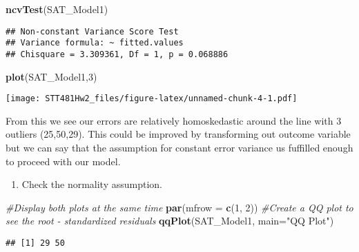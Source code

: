 \documentclass[]{article}
\newenvironment{Shaded}{\begin{snugshade}}{\end{snugshade}}
\newcommand{\KeywordTok}[1]{\textcolor[rgb]{0.13,0.29,0.53}{\textbf{#1}}}
\newcommand{\DataTypeTok}[1]{\textcolor[rgb]{0.13,0.29,0.53}{#1}}
\newcommand{\DecValTok}[1]{\textcolor[rgb]{0.00,0.00,0.81}{#1}}
\newcommand{\StringTok}[1]{\textcolor[rgb]{0.31,0.60,0.02}{#1}}
\newcommand{\CommentTok}[1]{\textcolor[rgb]{0.56,0.35,0.01}{\textit{#1}}}
\newcommand{\NormalTok}[1]{#1}
\providecommand{\tightlist}{%
  \setlength{\itemsep}{0pt}\setlength{\parskip}{0pt}}
\begin{document}
\begin{Shaded}
\begin{Highlighting}[]
\KeywordTok{ncvTest}\NormalTok{(SAT_Model1)}
\end{Highlighting}
\end{Shaded}

\begin{verbatim}
## Non-constant Variance Score Test 
## Variance formula: ~ fitted.values 
## Chisquare = 3.309361, Df = 1, p = 0.068886
\end{verbatim}

\begin{Shaded}
\begin{Highlighting}[]
\KeywordTok{plot}\NormalTok{(SAT_Model1,}\DecValTok{3}\NormalTok{)}
\end{Highlighting}
\end{Shaded}

\texttt{[image: STT481Hw2\_files/figure-latex/unnamed-chunk-4-1.pdf]}

From this we see our errors are relatively homoskedastic around the line
with 3 outliers (25,50,29). This could be improved by transforming out
outcome variable but we can say that the assumption for constant error
variance us fuffilled enough to proceed with our model.

\begin{enumerate}
\def\labelenumi{(\alph{enumi})}
\setcounter{enumi}{1}
\tightlist
\item
  Check the normality assumption.
\end{enumerate}

\begin{Shaded}
\begin{Highlighting}[]
\CommentTok{#Display both plots at the same time }
\KeywordTok{par}\NormalTok{(}\DataTypeTok{mfrow =} \KeywordTok{c}\NormalTok{(}\DecValTok{1}\NormalTok{, }\DecValTok{2}\NormalTok{))}
\CommentTok{#Create a QQ plot to see the root - standardized residuals }
\KeywordTok{qqPlot}\NormalTok{(SAT_Model1, }\DataTypeTok{main=}\StringTok{"QQ Plot"}\NormalTok{)}
\end{Highlighting}
\end{Shaded}

\begin{verbatim}
## [1] 29 50
\end{verbatim}
\end{document}
